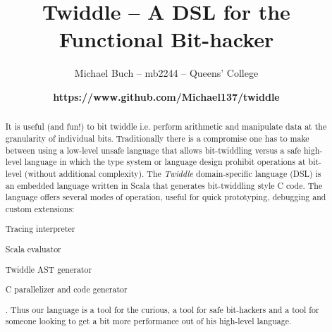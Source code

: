 \documentclass{article}
\title{Twiddle -- A DSL for the Functional Bit-hacker}
\author{Michael Buch -- mb2244 -- Queens' College}
\date{\small \textbf{https://www.github.com/Michael137/twiddle}}
\begin{document}
\maketitle
\frenchspacing

\begin{abstract}
It is useful (and fun!) to bit twiddle i.e. perform arithmetic and manipulate data at the granularity of individual bits. Traditionally there is a compromise one has to make between using a low-level unsafe language that allows bit-twiddling versus a safe high-level language in which the type system or language design prohibit operations at bit-level (without additional complexity). The \textit{Twiddle} domain-specific language (DSL) is an embedded language written in Scala that generates bit-twiddling style C code. The language offers several modes of operation, useful for quick prototyping, debugging and custom extensions:
\begin{enumerate*}[label=(\arabic*)]
	\item Tracing interpreter
	\item Scala evaluator
	\item Twiddle AST generator
	\item C parallelizer and code generator
\end{enumerate*}.
Thus our language is a tool for the curious, a tool for safe bit-hackers and a tool for someone looking to get a bit more performance out of his high-level language.
\end{abstract}
\end{document}
